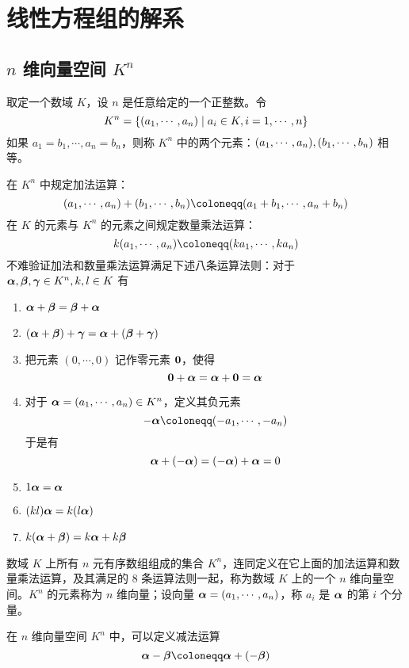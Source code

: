 \chapter{线性方程组的解系}

\section{\texorpdfstring{$n$ 维向量空间 $K^n$}{n 维向量空间 Kn}}

取定一个数域 $K$，设 $n$ 是任意给定的一个正整数。令
\[K^n=\{(a_1,\cdots,a_n) \mid a_i\in K,i=1,\cdots,n\}\]
如果 $a_1=b_1,\cdots,a_n=b_n$，则称 $K^n$ 中的两个元素：$(a_1,\cdots,a_n),(b_1,\cdots,b_n)$ 相等。

在 $K^n$ 中规定加法运算：
\[(\seq{a}{n})+(\seq{b}{n})\coloneqq (a_1+b_1,\cdots,a_n+b_n)\]
在 $K$ 的元素与 $K^n$ 的元素之间规定数量乘法运算：
\[k(\seq{a}{n}) \coloneqq  (\seq{ka}{n})\]
不难验证加法和数量乘法运算满足下述八条运算法则：对于 $\boldsymbol{\alpha},\boldsymbol{\beta},\boldsymbol{\gamma}\in K^n,k,l\in K$ 有

\begin{enumerate}
	\item $\boldsymbol{\alpha}+\boldsymbol{\beta}=\boldsymbol{\beta}+\boldsymbol{\alpha}$
	\item $(\boldsymbol{\alpha}+\boldsymbol{\beta})+\boldsymbol{\gamma}=\boldsymbol{\alpha}+(\boldsymbol{\beta}+\boldsymbol{\gamma})$
	\item 把元素 $(0,\cdots,0)$ 记作零元素 $\boldsymbol{0}$，使得
	      \[\boldsymbol{0} + \boldsymbol{\alpha} = \boldsymbol{\alpha} + \boldsymbol{0} = \boldsymbol{\alpha}\]
	\item 对于 $\boldsymbol{\alpha} = (a_1,\cdots,a_n)\in K^n$，定义其负元素
	      \[-\vbf{\alpha} \coloneqq  (\seq{-a}{n})\]
	      于是有
	      \[\boldsymbol{\alpha} + (-\boldsymbol{\alpha}) = (-\boldsymbol{\alpha})+\boldsymbol{\alpha} = 0\]
	\item $1\boldsymbol{\alpha} = \boldsymbol{\alpha}$
	\item $(kl)\boldsymbol{\alpha} = k(l\boldsymbol{\alpha})$
	\item $k (\boldsymbol{\alpha}+\boldsymbol{\beta}) = k\boldsymbol{\alpha} + k\boldsymbol{\beta}$
\end{enumerate}

\begin{definition}[$n$ 维向量空间]
	数域 $K$ 上所有 $n$ 元有序数组组成的集合 $K^n$，连同定义在它上面的加法运算和数量乘法运算，及其满足的 8 条运算法则一起，称为数域 $K$ 上的一个 $n$ 维向量空间。$K^n$ 的元素称为 $n$ 维向量；设向量 $\boldsymbol{\alpha}  = (a_1,\cdots,a_n)$，称 $a_i$ 是 $\boldsymbol{\alpha}$ 的第 $i$ 个分量。
\end{definition}

在 $n$ 维向量空间 $K^n$ 中，可以定义减法运算
\[\vbf{\alpha} - \vbf{\beta} \coloneqq  \vbf{\alpha} + (-\vbf{\beta})\]

